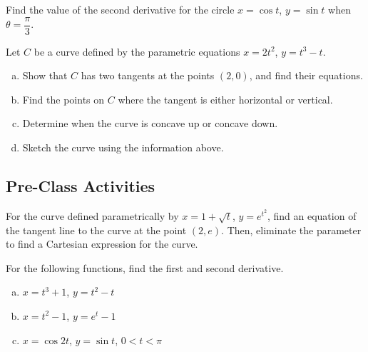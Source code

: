 \documentclass[notes2924]{subfiles}
\begin{document}
		\begin{ex}
			Find the value of the second derivative for the circle $x = \cos t$, $y = \sin t$ when $\theta = \dfrac{\pi}{3}$.
		\end{ex}
			\newpage
		
		\begin{ex}
			Let $C$ be a curve defined by the parametric equations $x = 2t^2$, $y = t^3-t$.
			\begin{enumerate}[(a)]
				\item Show that $C$ has two tangents at the points $(2,0)$, and find their equations.
					
				\item Find the points on $C$ where the tangent is either horizontal or vertical.
					
				\item Determine when the curve is concave up or concave down.
					
				\item Sketch the curve using the information above.
			\end{enumerate}
		\end{ex}	
			\newpage
			
	\subsection*{Pre-Class Activities}
		\begin{ex}
			For the curve defined parametrically by $x = 1 + \sqrt{t}$, $y = e^{t^2}$, find an equation of the tangent line to the curve at the point $(2,e)$.  Then, eliminate the parameter to find a Cartesian expression for the curve.
		\end{ex}
			\vs{1}
			
		\begin{ex}
			For the following functions, find the first and second derivative.
			\begin{enumerate}[(a)]
				\item $x = t^3 + 1$, $y = t^2-t$
					\vs{1}
					
				\item $x = t^2-1$, $y = e^t-1$
					\vs{1}
					
				\item $x = \cos 2t$, $y = \sin t$, $0 < t < \pi$
					\vs{1}
					
			\end{enumerate}
		\end{ex}
			\newpage
			
\end{document}

